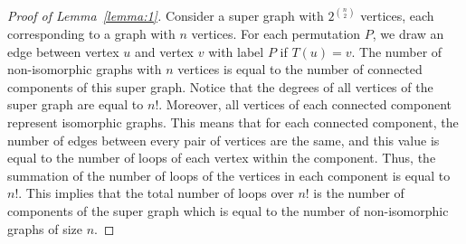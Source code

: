 \begin{solution}
\begin{proof}[Proof of Lemma~\ref{lemma:1}]
	Consider a super graph with $2^{\binom{n}{2}}$ vertices, each corresponding to a graph with $n$ vertices. For each permutation $P$, we draw an edge between vertex $u$ and vertex $v$ with label $P$ if $T(u) = v$. The number of non-isomorphic graphs with $n$ vertices is equal to the number of connected components of this super graph. Notice that the degrees of all vertices of the super graph are equal to $n!$. Moreover, all   vertices of each connected component represent isomorphic graphs. This means that for each connected component, the number of edges between every pair of vertices are the same, and this value is equal to the number of loops of each vertex within the component. Thus, the summation of the number of loops of the vertices in each component is equal to $n!$. This implies that the total number of loops over $n!$ is the number of components of the super graph which is equal to the number of non-isomorphic graphs of size $n$.
\end{proof}
\end{solution}